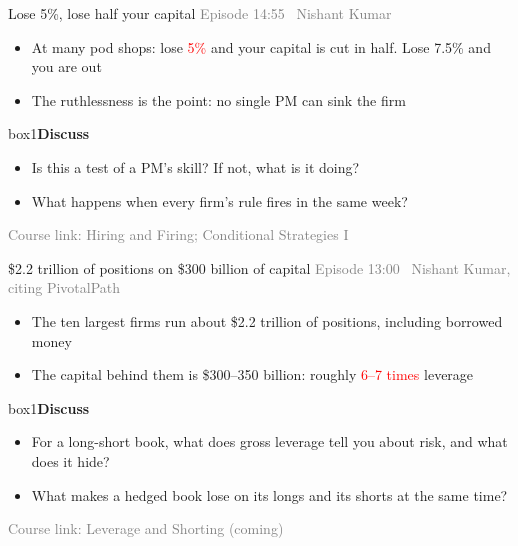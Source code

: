 \documentclass[aspectratio=169,10pt]{beamer}
\newcommand{\src}[1]{{\footnotesize\textcolor{gray}{Episode #1}}\par\vskip 6pt}
\newcommand{\course}[1]{{\footnotesize\textcolor{gray}{Course link: #1}}}
\newenvironment{discuss}{\begin{beamercolorbox}[rounded=true,sep=8pt]{box1}\textbf{Discuss}\par\vskip 3pt}{\end{beamercolorbox}}
\begin{document}
\begin{frame}[label=q6]{Lose 5\%, lose half your capital}
\src{14:55 \textbullet\ Nishant Kumar}
\begin{itemize}
\item At many pod shops: lose \textcolor{red}{5\%} and your capital is cut in half. Lose 7.5\% and you are out
\vskip 6pt
\item The ruthlessness is the point: no single PM can sink the firm
\end{itemize}
\vskip 12pt
\begin{discuss}
\begin{itemize}
\item Is this a test of a PM's skill? If not, what is it doing?
\item What happens when every firm's rule fires in the same week?
\end{itemize}
\end{discuss}
\vfill
\course{Hiring and Firing; Conditional Strategies I} \hfill \hyperlink{appendix_stop}{}
\end{frame}

\begin{frame}[label=q7]{\$2.2 trillion of positions on \$300 billion of capital}
\src{13:00 \textbullet\ Nishant Kumar, citing PivotalPath}
\begin{itemize}
\item The ten largest firms run about \$2.2 trillion of positions, including borrowed money
\vskip 6pt
\item The capital behind them is \$300--350 billion: roughly \textcolor{red}{6--7 times} leverage
\end{itemize}
\vskip 12pt
\begin{discuss}
\begin{itemize}
\item For a long-short book, what does gross leverage tell you about risk, and what does it hide?
\item What makes a hedged book lose on its longs and its shorts at the same time?
\end{itemize}
\end{discuss}
\vfill
\course{Leverage and Shorting (coming)} \hfill \hyperlink{appendix_lev}{}
\end{frame}
\end{document}
